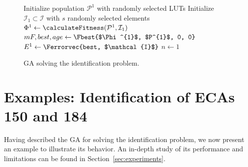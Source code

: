 \begin{figure}
\removelatexerror
\begin{algorithm}[H]
Initialize population $\mathcal{P}^1$ with randomly selected LUTs\;
Initialize $\mathcal{I}_1\subset \mathcal{I}$ with $s$ randomly selected elements\;
$\Phi^{1} \gets \calculateFitness(\mathcal{P}^{1}, \mathcal{I}_1)$\;
$mF, best, age \gets \Fbest{$\Phi^{1}$, $P^{1}$, 0, 0}$\;
$E^{1} \gets \Ferrorvec{best, $\mathcal{I}$}$\;
$n\gets 1$\;
\caption{GA solving the identification problem.}\label{algo:ga}
\end{algorithm}
\end{figure}

\section{Examples: Identification of ECAs 150 and 184}\label{sec:example1}
Having described the GA for solving the identification problem, we now present an example to illustrate its behavior. An in-depth study of its performance and limitations can be found in Section~\ref{sec:experiments}.

